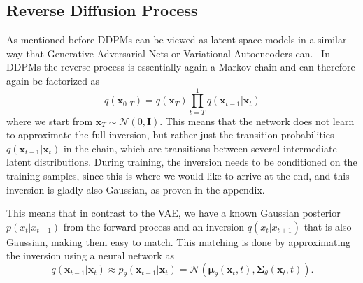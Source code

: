 \subsection{Reverse Diffusion Process}
As mentioned before DDPMs can be viewed as latent space models in a similar way that Generative Adversarial Nets or Variational Autoencoders can.~\autocite{goodfellow2014generative,kingma2013autoencoding} In DDPMs the reverse process is essentially again a Markov chain and can therefore again be factorized as
\begin{equation}
    \label{eq:reverseprocess}
    q(\bm{x}_{0:T}) = q(\bm{x}_T) \prod_{t=T}^{1} q(\bm{x}_{t-1}|\bm{x}_{t})
\end{equation}
where we start from $\bm{x}_T\sim\mathcal{N}(0,\bm{I})$. This means that the network does not learn to approximate the full inversion, but rather just the transition probabilities $q(\bm{x}_{t-1}|\bm{x}_{t})$ in the chain, which are transitions between several intermediate latent distributions. During training, the inversion needs to be conditioned on the training samples, since this is where we would like to arrive at the end, and this inversion is gladly also Gaussian, as proven in the appendix.

This means that in contrast to the VAE, we have a known Gaussian posterior $p(x_{t}|x_{t-1})$ from the forward process and an inversion $q(x_{t}|x_{t+1})$ that is also Gaussian, making them easy to match. This matching is done by approximating the inversion using a neural network as
\begin{equation}
    \label{eq:reverseapprox}
    q(\bm{x}_{t-1} | \bm{x}_t) \approx p_{\theta}(\bm{x}_{t-1} | \bm{x}_t) = \mathcal{N}(\bm{\mu}_{\theta}(\bm{x}_t, t),\bm{\Sigma}_{\theta}(\bm{x}_t, t)).
\end{equation}

